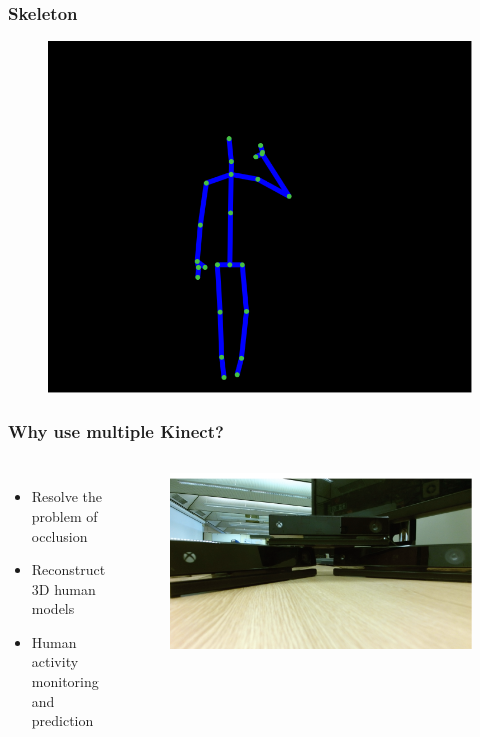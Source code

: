 \documentclass{beamer}
\begin{document}
\begin{frame}
\frametitle{Skeleton}
\begin{figure}
\includegraphics[width=0.7\linewidth]{skeleton}
\end{figure}
\end{frame}

\begin{frame}
\frametitle{Why use multiple Kinect?}
\begin{columns}[c]
\begin{itemize}
	\item Resolve the problem of occlusion
	\item Reconstruct 3D human models
	\item Human activity monitoring and prediction
\end{itemize}
\begin{figure}
\includegraphics[width=0.8\linewidth]{multiple_kinects}
\end{figure}
\end{columns}
\end{frame}
\end{document}
